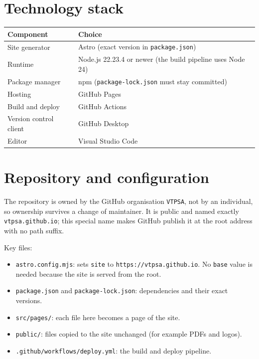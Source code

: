 \documentclass[11pt,a4paper]{article}
\begin{document}
\section{Technology stack}
\begin{center}
\begin{tabular}{@{}ll@{}}
\toprule
\textbf{Component} & \textbf{Choice} \\
\midrule
Site generator & Astro (exact version in \texttt{package.json}) \\
Runtime & Node.js 22.23.4 or newer (the build pipeline uses Node 24) \\
Package manager & npm (\texttt{package-lock.json} must stay committed) \\
Hosting & GitHub Pages \\
Build and deploy & GitHub Actions \\
Version control client & GitHub Desktop \\
Editor & Visual Studio Code \\
\bottomrule
\end{tabular}
\end{center}

\section{Repository and configuration}
The repository is owned by the GitHub organisation \texttt{VTPSA}, not by an
individual, so ownership survives a change of maintainer. It is public and
named exactly \texttt{vtpsa.github.io}; this special name makes GitHub publish
it at the root address with no path suffix.

Key files:
\begin{itemize}[nosep]
  \item \texttt{astro.config.mjs}: sets \texttt{site} to
        \texttt{https://vtpsa.github.io}. No \texttt{base} value is needed
        because the site is served from the root.
  \item \texttt{package.json} and \texttt{package-lock.json}: dependencies and
        their exact versions.
  \item \texttt{src/pages/}: each file here becomes a page of the site.
  \item \texttt{public/}: files copied to the site unchanged (for example PDFs
        and logos).
  \item \texttt{.github/workflows/deploy.yml}: the build and deploy pipeline.
\end{itemize}
\end{document}
